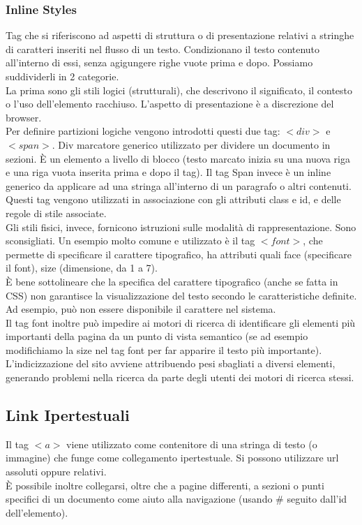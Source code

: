 \documentclass{article}
\begin{document}
\subsubsection{Inline Styles}
Tag che si riferiscono ad aspetti di struttura o di presentazione relativi a stringhe di caratteri inseriti nel flusso di un testo. Condizionano il testo contenuto all'interno di essi, senza agigungere righe vuote prima e dopo.
Possiamo suddividerli in 2 categorie.\\
La prima sono gli stili logici (strutturali), che descrivono il significato, il contesto o l'uso dell'elemento racchiuso. L'aspetto di presentazione è a discrezione del browser.\\
Per definire partizioni logiche vengono introdotti questi due tag: $<div>$ e $<span>$. Div marcatore generico utilizzato per dividere un documento in sezioni. È un elemento a livello di blocco (testo marcato inizia su una nuova riga e una riga vuota inserita prima e dopo il tag). Il tag Span invece è un inline generico da applicare ad una stringa all'interno di un paragrafo o altri contenuti. Questi tag vengono utilizzati in associazione con gli attributi class e id, e delle regole di stile associate.\\
Gli stili fisici, invece, fornicono istruzioni sulle modalità di rappresentazione. Sono sconsigliati. Un esempio molto comune e utilizzato è il tag $<font>$, che permette di specificare il carattere tipografico, ha attributi quali face (specificare il font), size (dimensione, da 1 a 7). \\
È bene sottolineare che la specifica del carattere tipografico (anche se fatta in CSS) non garantisce la visualizzazione del testo secondo le caratteristiche definite. Ad esempio, può non essere disponibile il carattere nel sistema.\\ Il tag font inoltre può impedire ai motori di ricerca di identificare gli elementi più importanti della pagina da un punto di vista semantico (se ad esempio modifichiamo la size nel tag font per far apparire il testo più importante). L'indicizzazione del sito avviene attribuendo pesi sbagliati a diversi elementi, generando problemi nella ricerca da parte degli utenti dei motori di ricerca stessi.
\subsection{Link Ipertestuali}
Il tag $<a>$ viene utilizzato come contenitore di una stringa di testo (o immagine) che funge come collegamento ipertestuale. Si possono utilizzare url assoluti oppure relativi.\\
È possibile inoltre collegarsi, oltre che a pagine differenti, a sezioni o punti specifici di un documento come aiuto alla navigazione (usando $\#$ seguito dall'id dell'elemento).
\end{document}
